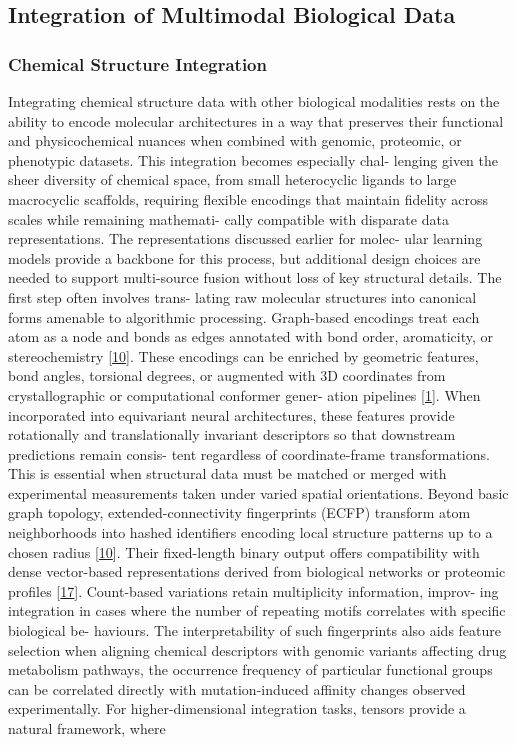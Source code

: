\documentclass[
]{article}
\begin{document}
\subsection{Integration of Multimodal Biological
Data}\label{integration-of-multimodal-biological-data}

\subsubsection{Chemical Structure
Integration}\label{chemical-structure-integration}

Integrating chemical structure data with other biological modalities
rests on the ability to encode molecular architectures in a way that
preserves their functional and physicochemical nuances when combined
with genomic, proteomic, or phenotypic datasets. This integration
becomes especially chal- lenging given the sheer diversity of chemical
space, from small heterocyclic ligands to large macrocyclic scaffolds,
requiring flexible encodings that maintain fidelity across scales while
remaining mathemati- cally compatible with disparate data
representations. The representations discussed earlier for molec- ular
learning models provide a backbone for this process, but additional
design choices are needed to support multi-source fusion without loss of
key structural details. The first step often involves trans- lating raw
molecular structures into canonical forms amenable to algorithmic
processing. Graph-based encodings treat each atom as a node and bonds as
edges annotated with bond order, aromaticity, or stereochemistry
{[}\hyperref[_bookmark50]{10}{]}. These encodings can be enriched by
geometric features, bond angles, torsional degrees, or augmented with 3D
coordinates from crystallographic or computational conformer gener-
ation pipelines {[}\hyperref[_bookmark41]{1}{]}. When incorporated into
equivariant neural architectures, these features provide rotationally
and translationally invariant descriptors so that downstream predictions
remain consis- tent regardless of coordinate-frame transformations. This
is essential when structural data must be matched or merged with
experimental measurements taken under varied spatial orientations.
Beyond basic graph topology, extended-connectivity fingerprints (ECFP)
transform atom neighborhoods into hashed identifiers encoding local
structure patterns up to a chosen radius
{[}\hyperref[_bookmark50]{10}{]}. Their fixed-length binary output
offers compatibility with dense vector-based representations derived
from biological networks or proteomic profiles
{[}\hyperref[_bookmark57]{17}{]}. Count-based variations retain
multiplicity information, improv- ing integration in cases where the
number of repeating motifs correlates with specific biological be-
haviours. The interpretability of such fingerprints also aids feature
selection when aligning chemical descriptors with genomic variants
affecting drug metabolism pathways, the occurrence frequency of
particular functional groups can be correlated directly with
mutation-induced affinity changes observed experimentally. For
higher-dimensional integration tasks, tensors provide a natural
framework, where
\end{document}
